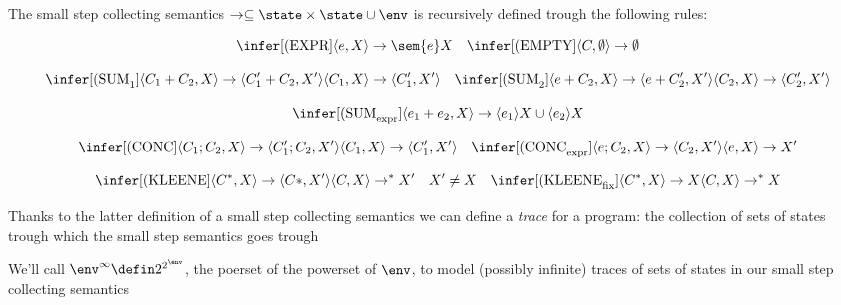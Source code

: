 \begin{definition}
  The small step collecting semantics \(\to \subseteq \state \times
  \state \cup \env\) is recursively defined trough the following rules:

  \[\infer[\text{(EXPR}]{\langle e, X \rangle \to \sem{e} X}{}
  \quad
  \infer[\text{(EMPTY}]
      {\langle C, \emptyset \rangle \to \emptyset}
      {}\]
      
  \[\infer[\text{(SUM}_1]
      {\langle C_1 + C_2 , X \rangle \to \langle C_1' + C_2 , X' \rangle}
      {\langle C_1 , X \rangle \to \langle C_1' , X' \rangle}
    \quad
    \infer[\text{(SUM}_2]
        {\langle e + C_2 , X \rangle \to \langle e + C_2' , X' \rangle}
        {\langle C_2 , X \rangle \to \langle C_2' , X' \rangle}
        \]

  \[\infer[\text{(SUM}_{\text{expr}}]
      {\langle e_1 + e_2 , X \rangle \to \langle e_1 \rangle X \cup \langle e_2\rangle X}
      {}
  \]
                
  \[\infer[\text{(CONC}]
      {\langle C_1;C_2 , X\rangle \to \langle C_1';C_2 , X' \rangle}
      {\langle C_1, X \rangle \to \langle C_1', X' \rangle}
    \quad
    \infer[\text{(CONC}_{\text{expr}}]
      {\langle e;C_2 , X\rangle \to \langle C_2 , X' \rangle}
      {\langle e, X \rangle \to X'}
  \]
          
  \[\infer[\text{(KLEENE}]
      {\langle C^* , X \rangle \to \langle C*, X' \rangle}
      {\langle C , X \rangle \to^* X' \quad X' \neq X}
    \quad
    \infer[\text{(KLEENE}_{\text{fix}}]
      {\langle C^*, X \rangle \to X}
      {\langle C , X \rangle \to^* X}
  \]
\end{definition}

Thanks to the latter definition of a small step collecting semantics
we can define a \emph{trace} for a program: the collection of sets of
states trough which the small step semantics goes trough

\begin{notation}
  We'll call \(\env^\infty \defin 2^{2^\env}\), the poerset of the
  powerset of \(\env\), to model (possibly infinite) traces of sets of
  states in our small step collecting semantics
\end{notation}

